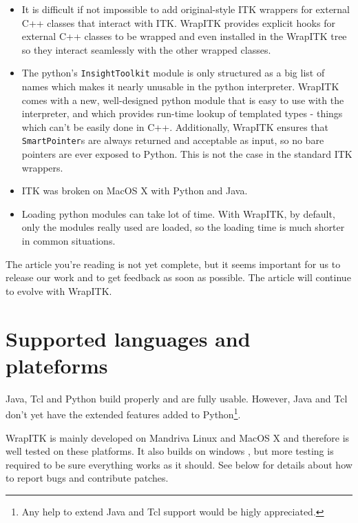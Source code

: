 \documentclass{InsightArticle}
\begin{document}
\begin{itemize}
  \item  It is difficult if not impossible to add original-style ITK wrappers for
external C++ classes that interact with ITK. WrapITK provides explicit hooks for
external C++ classes to be wrapped and even installed in the WrapITK tree so
they interact seamlessly with the other wrapped classes.

  \item  The python's \verb$InsightToolkit$ module is only structured as a big
list of names which makes it nearly unusable in the python interpreter. WrapITK
comes with a new, well-designed python module that is easy to use with the interpreter, and
which provides run-time lookup of templated types - things which can't be easily done
in C++. Additionally, WrapITK ensures that \verb$SmartPointer$s are always
returned and acceptable as input, so no bare pointers are ever exposed to
Python. This is not the case in the standard ITK wrappers.

  \item ITK was broken on MacOS X \cite{MacOsXWebSite} with Python and Java.

  \item  Loading python modules can take lot of time. With WrapITK, by default,
only the modules really used are loaded, so the loading time is much shorter
in common situations.

\end{itemize}

The article you're reading is not yet complete,
but it seems important for us to release our work and to get feedback
as soon as possible. The article will continue to evolve with WrapITK.

\newpage
\part{Supported languages and plateforms}

Java, Tcl and Python build properly and are fully usable. However, Java and
Tcl don't yet have the extended features added to Python\footnote{Any help
to extend Java and Tcl support would be higly appreciated.}.

WrapITK is mainly developed on Mandriva Linux \cite{MandrivaWebSite} and 
MacOS X \cite{MacOsXWebSite} and therefore is well tested on these platforms.
It also builds on windows \cite{WindowsWebSite}, but more testing is required
to be sure everything works as it should. See below for details about how
to report bugs and contribute patches.
\end{document}
